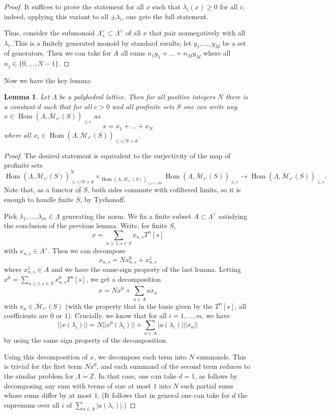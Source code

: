 \documentclass[11pt]{amsbook}
\DeclareMathOperator{\Hom}{Hom}
\numberwithin{equation}{section}
\numberwithin{theorem}{section}
\newtheorem{lemma}[theorem]{Lemma}
\theoremstyle{definition}
\begin{document}
\begin{proof} It suffices to prove the statement for all $x$ such that $\lambda_i(x)\geq 0$ for all $i$; indeed, applying this variant to all $\pm \lambda_i$, one gets the full statement.

Thus, consider the submonoid $\Lambda^\vee_+\subset \Lambda^\vee$ of all $x$ that pair nonnegatively with all $\lambda_i$. This is a finitely generated monoid by standard results; let $y_1,\ldots,y_M$ be a set of generators. Then we can take for $A$ all sums $n_1y_1+\ldots+n_My_M$ where all $n_j\in \{0,\ldots,N-1\}$.
\end{proof}

Now we have the key lemma:

\begin{lemma}\label{lem:key} Let $\Lambda$ be a polyhedral lattice. Then for all positive integers $N$ there is a constant $d$ such that for all $c>0$ and all profinite sets $S$ one can write any $x\in \Hom(\Lambda,\overline{\mathcal M}_{r'}(S))_{\leq c}$ as
\[
x=x_1+\ldots+x_N
\]
where all $x_i\in \Hom(\Lambda,\overline{\mathcal M}_{r'}(S))_{\leq c/N+d}$.
\end{lemma}

\begin{proof} The desired statement is equivalent to the surjectivity of the map of profinite sets
\[
\Hom(\Lambda,\overline{\mathcal M}_{r'}(S))_{\leq c/N+d}^N\times_{\Hom(\Lambda,\overline{\mathcal M}_{r'}(S))_{\leq c+Nd}} \Hom(\Lambda,\overline{\mathcal M}_{r'}(S))_{\leq c}\to \Hom(\Lambda,\overline{\mathcal M}_{r'}(S))_{\leq c}.
\]
Note that, as a functor of $S$, both sides commute with cofiltered limits, so it is enough to handle finite $S$, by Tychonoff.

Pick $\lambda_1,\ldots,\lambda_m\in \Lambda$ generating the norm. We fix a finite subset $A\subset \Lambda^\vee$ satisfying the conclusion of the previous lemma. Write, for finite $S$,
\[
x=\sum_{n\geq 1, s\in S} x_{n,s} T^n [s]
\]
with $x_{n,s}\in \Lambda^\vee$. Then we can decompose
\[
x_{n,s} = N x_{n,s}^0 + x_{n,s}^1
\]
where $x_{n,s}^1\in A$ and we have the same-sign property of the last lemma. Letting $x^0 = \sum_{n\geq 1, s\in S} x_{n,s}^0 T^n [s]$, we get a decomposition
\[
x = Nx^0 + \sum_{a\in A} a x_a
\]
with $x_a\in \overline{\mathcal M}_{r'}(S)$ (with the property that in the
basis given by the $T^n [s]$, all coefficients are $0$ or $1$). Crucially,
we know that for all $i=1,\ldots,m$, we have
\[
||x(\lambda_i)|| = N ||x^0(\lambda_i)|| + \sum_{a\in A} |a(\lambda_i)| ||x_a||
\]
by using the same sign property of the decomposition.

Using this decomposition of $x$, we decompose each term into $N$ summands. This is trivial for the first term $Nx^0$, and each summand of the second term reduces to the similar problem for $\Lambda=\mathbb Z$. In that case, one can take $d=1$, as follows by decomposing any sum with terms of size at most $1$ into $N$ such partial sums whose sums differ by at most $1$. (It follows that in general one can take for $d$ the supremum over all $i$ of $\sum_{a\in A} |a(\lambda_i)|$.)
\end{proof}
\end{document}
